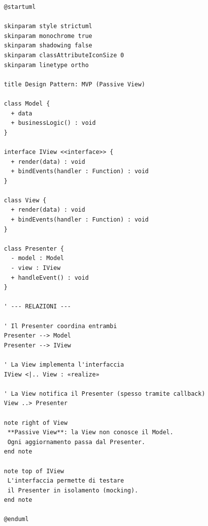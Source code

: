 \begin{verbatim}
@startuml

skinparam style strictuml
skinparam monochrome true
skinparam shadowing false
skinparam classAttributeIconSize 0
skinparam linetype ortho

title Design Pattern: MVP (Passive View)

class Model {
  + data
  + businessLogic() : void
}

interface IView <<interface>> {
  + render(data) : void
  + bindEvents(handler : Function) : void
}

class View {
  + render(data) : void
  + bindEvents(handler : Function) : void
}

class Presenter {
  - model : Model
  - view : IView
  + handleEvent() : void
}

' --- RELAZIONI ---

' Il Presenter coordina entrambi
Presenter --> Model
Presenter --> IView

' La View implementa l'interfaccia
IView <|.. View : «realize»

' La View notifica il Presenter (spesso tramite callback)
View ..> Presenter

note right of View
 **Passive View**: la View non conosce il Model.
 Ogni aggiornamento passa dal Presenter.
end note

note top of IView
 L'interfaccia permette di testare 
 il Presenter in isolamento (mocking).
end note

@enduml
\end{verbatim}